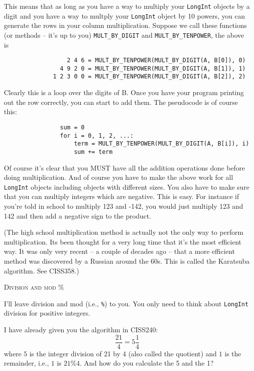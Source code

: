 This means that as long as you have a way to multiply your 
\verb!LongInt! objects by a digit and you have a way to multply 
your \verb!LongInt! object by 10 powers, you can generate the 
rows in your column multiplication. Suppose we call these 
functions (or methods – it's up to you) \verb!MULT_BY_DIGIT! 
and \verb!MULT_BY_TENPOWER!, the above is

\begin{Verbatim}
                  2 4 6 = MULT_BY_TENPOWER(MULT_BY_DIGIT(A, B[0]), 0)
                4 9 2 0 = MULT_BY_TENPOWER(MULT_BY_DIGIT(A, B[1]), 1)
              1 2 3 0 0 = MULT_BY_TENPOWER(MULT_BY_DIGIT(A, B[2]), 2)
\end{Verbatim}

Clearly this is a loop over the digits of B. Once you have your program 
printing out the row correctly, you can start to add them. The 
pseudocode is of course this:

\begin{Verbatim}
                sum = 0
                for i = 0, 1, 2, ...:
                    term = MULT_BY_TENPOWER(MULT_BY_DIGIT(A, B[i]), i)
                    sum += term
\end{Verbatim}

Of course it's clear that you MUST have all the addition operations 
done before doing multiplication. And of course you have to make the 
above work for all \verb!LongInt! objects including objects with 
different sizes. You also have to make sure that you can multiply 
integers which are negative. This is easy. For instance if you're 
told in school to multiply 123 and -142, you would just multiply 123 
and 142 and then add a negative sign to the product.

(The high school multiplication method is actually not the only 
way to perform multiplication. Its been thought for a very long time 
that it's the most efficient way. It was only very recent – a couple 
of decades ago – that a more efficient method was discovered by a 
Russian around the 60s. This is called the Karatsuba algorithm.
See CISS358.)


\newpage 
\textsc{Division and mod \%}

I'll leave division and mod (i.e., \texttt{\%}) to you. You only need to think 
about \verb!LongInt! division for positive integers.

I have already given you the algorithm in CISS240:
\[
\frac{21}{4} = 5 \frac{1}{4}
\]
where $5$ is the integer division of 21 by 4 (also called the quotient)
and $1$ is the remainder, i.e., $1$ is $21 \% 4$.
And how do you calculate the 5 and the 1?

